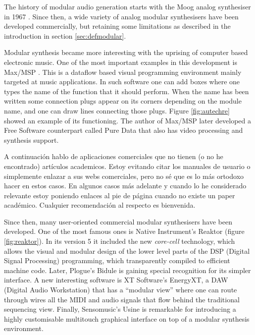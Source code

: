 The history of modular audio generation starts with the Moog
analog synthesiser in 1967 \cite{moog1964voltage}. Since then, a wide
variety of analog modular synthesisers have been developed
commercially, but retaining some limitations as described in the
introduction in section \ref{sec:defmodular}.

Modular synthesis became more interesting with the uprising of
computer based electronic music. One of the most important examples in
this development is Max/MSP \cite{puckete2002max}. This is a dataflow
based visual programming environment mainly targeted at music
applications. In such software one can add boxes where one types the
name of the function that it should perform. When the name has been
written some connection plugs appear on its corners depending on the
module name, and one can draw lines connecting those plugs. Figure
\ref{fig:autechre} showed an example of its functioning. The author of
Max/MSP later developed a Free Software counterpart called Pure
Data\cite{puckette96puredata} that also has video processing
and synthesis support.

\begin{todo}
  A continuación hablo de aplicaciones comerciales que no tienen (o no
  he encontrado) artículos academicos. Estoy evitando citar los manuales
  de usuario o simplemente enlazar a sus webs comerciales, pero no sé
  que es lo más ortodoxo hacer en estos casos. En algunos casos más
  adelante y cuando lo he considerado relevante estoy poniendo enlaces
  al pie de página cuando no existe un paper académico. Cualquier
  recomendación al respecto es bienvenida.
\end{todo}

Since then, many user-oriented commercial modular synthesisers have
been developed. One of the most famous ones is Native Instrument's
Reaktor (figure \ref{fig:reaktor}). In its version 5 it included the
new \emph{core-cell} technology, which allows the visual and modular
design of the lower level parts of the DSP (Digital Signal
Processing) programming, which transparently compiled to efficient
machine code. Later, Plogue's Bidule is gaining special recognition
for its simpler interface. A new interesting software is XT Software's
EnergyXT, a DAW (Digital Audio Workstation) that has a ``modular
view'' where one can route through wires all the MIDI and audio
signals that flow behind the traditional sequencing view. Finally,
Sensomusic's Usine is remarkable for introducing a highly customisable
multitouch graphical interface on top of a modular synthesis
environment.

